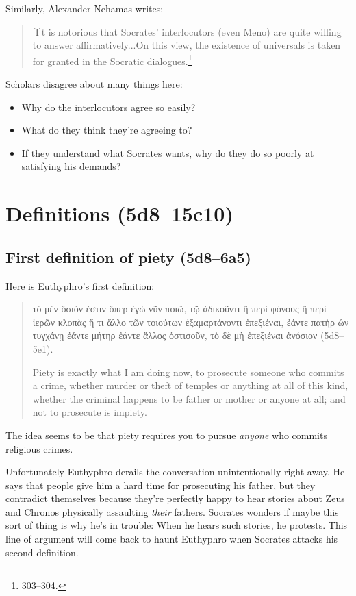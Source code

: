 \documentclass[11pt]{article}
\begin{document}
Similarly, Alexander Nehamas writes:

\begin{quote}
    [I]t is notorious that Socrates' interlocutors (even Meno) are quite willing to answer affirmatively...On this view, the existence of universals is taken for granted in the Socratic dialogues.\footnote{\citet{nehamas1975} 303--304.}
\end{quote}

Scholars disagree about many things here:

\begin{itemize}
    \item Why do the interlocutors agree so easily?
    \item What do they think they're agreeing to?
    \item If they understand what Socrates wants, why do they do so poorly at satisfying his demands?
\end{itemize}

\section{Definitions (5d8--15c10)}

\subsection{First definition of piety (5d8--6a5)}

Here is Euthyphro's first definition:

\begin{quote}
    τὸ μὲν ὅσιόν ἐστιν ὅπερ ἐγὼ νῦν ποιῶ, τῷ ἀδικοῦντι ἢ περὶ φόνους ἢ περὶ ἱερῶν κλοπὰς ἤ τι ἄλλο τῶν τοιούτων ἐξαμαρτάνοντι ἐπεξιέναι, ἐάντε πατὴρ ὢν τυγχάνῃ ἐάντε μήτηρ ἐάντε ἄλλος ὁστισοῦν, τὸ δὲ μὴ ἐπεξιέναι ἀνόσιον (5d8--5e1).

    Piety is exactly what I am doing now, to prosecute someone who commits a crime, whether murder or theft of temples or anything at all of this kind, whether the criminal happens to be father or mother or anyone at all; and not to prosecute is impiety.
\end{quote}

The idea seems to be that piety requires you to pursue \emph{anyone} who commits religious crimes.

Unfortunately Euthyphro derails the conversation unintentionally right away.  He says that people give him a hard time for prosecuting his father, but they contradict themselves because they're perfectly happy to hear stories about Zeus and Chronos physically assaulting \emph{their} fathers.  Socrates wonders if maybe this sort of thing is why he's in trouble: When he hears such stories, he protests.  This line of argument will come back to haunt Euthyphro when Socrates attacks his second definition.
\end{document}
